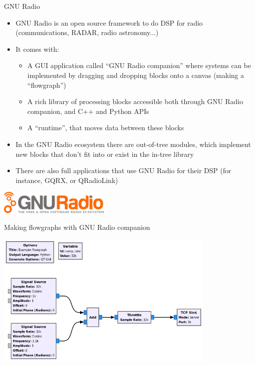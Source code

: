 \documentclass[aspectratio=169]{beamer}
\date{22 June 2023}
\institute
{}
\begin{document}
\begin{frame}{GNU Radio}
  \begin{itemize}
    \item GNU Radio is an open source framework to do DSP for radio
      (communications, RADAR, radio astronomy...)
    \item It comes with:
      \begin{itemize}
        \item A GUI application called ``GNU Radio companion'' where
             systems can be implemented by dragging and dropping blocks onto a
             canvas (making a ``flowgraph'')
        \item A rich library of processing blocks accessible both through GNU Radio
          companion, and C++ and Python APIs
        \item A ``runtime'', that moves data between these blocks
      \end{itemize}
    \item In the GNU Radio ecosystem there are out-of-tree modules, which
      implement new blocks that don't fit into or exist in the in-tree library
    \item There are also full applications that use GNU Radio for their DSP (for
      instance, GQRX, or QRadioLink)
  \end{itemize}
  \includegraphics[width=0.4\textwidth]{gnuradio_logo}
\end{frame}

\begin{frame}{Making flowgraphs with GNU Radio companion}
  \begin{center}
    \includegraphics[width=0.8\textwidth]{example_flowgraph}
  \end{center}
\end{frame}
\end{document}
